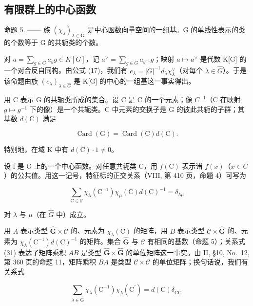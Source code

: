 \subsection{有限群上的中心函数}

命题 5. —— 族 \((\chi_{\lambda})_{\lambda\in\widehat{\mathbf{G}}}\) 是中心函数向量空间的一组基。G 的单线性表示的类的个数等于 G 的共轭类的个数。

对 \(a = \sum_{g \in G} a_g g \in K[G]\)，记 \(a^\vee = \sum_{g \in G} a_{g^{-1}} g\)；映射 \(a \mapsto a^\vee\) 是代数 K{[}G{]} 的一个对合反自同构。由公式 (17)，我们有 \(e_\lambda = |G|^{-1} d_\lambda \chi_\lambda^\vee\)（对每个 \(\lambda \in \widehat{G}\)）。于是该命题由族 \((e_\lambda)_{\lambda \in \widehat{G}}\) 是 K{[}G{]} 的中心的一组基这一事实得出。

用 C 表示 G 的共轭类所成的集合。设 C 是 C 的一个元素；像 \(C^{-1}\)（C 在映射 \(g \mapsto g^{-1}\) 下的像）是一个共轭类。C 中元素的交换子是 G 的彼此共轭的子群；其基数 \(d(\mathrm{C})\) 满足

\[
\operatorname{Card} (\mathrm{G}) = \operatorname{Card} (\mathrm{C}) d (\mathrm{C}).\tag{30}
\]

特别地，在域 K 中有 \(d(\mathrm{C}) \cdot 1 \neq 0\)。

设 f 是 G 上的一个中心函数。对任意共轭类 C，用 \(f(\mathrm{C})\) 表示诸 \(f(x)\)（\(x \in C\)）的公共值。用这一记号，特征标的正交关系（VIII, 第 410 页，命题 4）可写为

\[
\sum_ {\mathrm{C} \in \mathcal {C}} \chi_ {\lambda} (\mathrm{C} ^ {- 1}) \chi_ {\mu} (\mathrm{C}) d (\mathrm{C}) ^ {- 1} = \delta_ {\lambda \mu}\tag{31}
\]

对 \(\lambda\) 与 \(\mu\)（在 \(\widehat{G}\) 中）成立。

用 \(A\) 表示类型 \(\widehat{\mathbf{G}} \times \mathcal{C}\) 的、元素为 \(\chi_{\lambda}(\mathrm{C})\) 的矩阵，用 \(B\) 表示类型 \(\mathcal{C} \times \widehat{\mathbf{G}}\) 的、元素为 \(\chi_{\lambda}(\mathrm{C}^{-1}) d(\mathrm{C})^{-1}\) 的矩阵。集合 \(\widehat{\mathbf{G}}\) 与 \(\mathcal{C}\) 有相同的基数（命题 5）；关系式 (31) 表达了矩阵乘积 \(AB\) 是类型 \(\widehat{\mathbf{G}} \times \widehat{\mathbf{G}}\) 的单位矩阵这一事实。由 II, §10, No.~12, 第 360 页的命题 11，矩阵乘积 \(BA\) 是类型 \(\mathcal{C} \times \mathcal{C}\) 的单位矩阵；换句话说，我们有关系式

\[
\sum_ {\lambda \in \widehat {\mathrm{G}}} \chi_ {\lambda} (\mathrm{C} ^ {- 1}) \chi_ {\lambda} (\mathrm{C} ^ {\prime}) = d (\mathrm{C}) \delta_ {\mathrm{CC} ^ {\prime}}\tag{32}
\]


